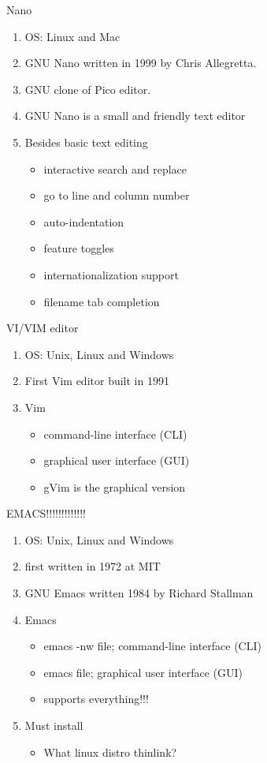 \documentclass[t,10pt]{beamer}
\begin{document}
\begin{frame}[label={sec:orgheadline9}]{Nano}
\begin{enumerate}[<+->]
\item OS: Linux and Mac
\item GNU Nano written in 1999 by Chris Allegretta.
\item GNU clone of Pico editor.
\item GNU Nano is a small and friendly text editor
\item Besides basic text editing
\begin{itemize}
\item interactive search and replace
\item go to line and column number
\item auto-indentation
\item feature toggles
\item internationalization support
\item filename tab completion
\end{itemize}
\end{enumerate}
\end{frame}

\begin{frame}[label={sec:orgheadline10}]{VI/VIM editor}
\begin{enumerate}[<+->]
\item OS: Unix, Linux and Windows
\item First Vim editor built in 1991
\item Vim 
\begin{itemize}
\item command-line interface (CLI)
\item graphical user interface (GUI)
\item gVim is the graphical version
\end{itemize}
\end{enumerate}
\end{frame}

\begin{frame}[label={sec:orgheadline11}]{EMACS!!!!!!!!!!!!!}
\begin{enumerate}[<+->]
\item OS: Unix, Linux and Windows
\item first written in 1972 at MIT
\item GNU Emacs written 1984 by Richard Stallman
\item Emacs
\begin{itemize}
\item emacs -nw file; command-line interface (CLI)
\item emacs file; graphical user interface (GUI)
\item supports everything!!!
\end{itemize}
\item Must install
\begin{itemize}
\item What linux distro thinlink?
\end{itemize}
\end{enumerate}
\end{frame}
\end{document}
